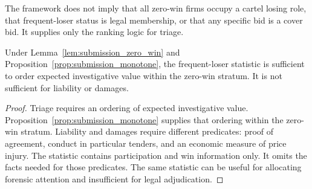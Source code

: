 The framework does not imply that all zero-win firms occupy a
cartel losing role, that frequent-loser status is legal
membership, or that any specific bid is a cover bid. It supplies
only the ranking logic for triage.

\begin{proposition}
\label{prop:submission_scope}
Under Lemma~\ref{lem:submission_zero_win} and
Proposition~\ref{prop:submission_monotone}, the frequent-loser statistic
is sufficient to order expected investigative value within the
zero-win stratum. It is not sufficient for liability or damages.
\end{proposition}

\begin{proof}
Triage requires an ordering of expected investigative value.
Proposition~\ref{prop:submission_monotone} supplies that ordering
within the zero-win stratum. Liability and damages require
different predicates: proof of agreement, conduct in particular
tenders, and an economic measure of price injury. The statistic contains
participation and win information only. It omits the facts needed
for those predicates. The same statistic can be useful for
allocating forensic attention and insufficient for legal
adjudication.
\end{proof}
